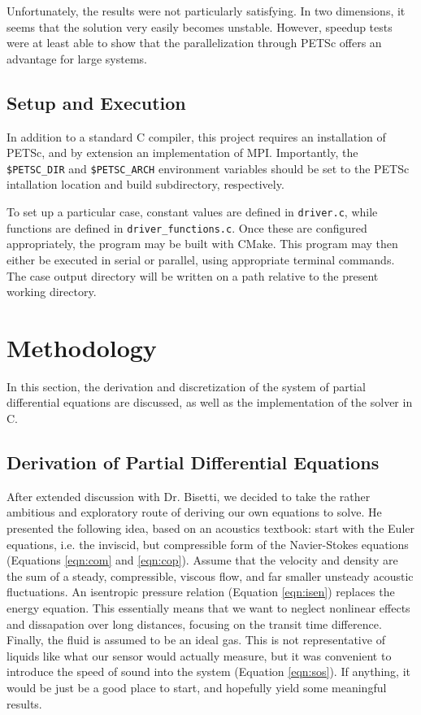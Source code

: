 \documentclass{article}
\begin{document}
Unfortunately, the results were not particularly satisfying. In two dimensions, it seems that the solution very easily becomes unstable. However, speedup tests were at least able to show that the parallelization through PETSc offers an advantage for large systems.

\subsection{Setup and Execution}

In addition to a standard C compiler, this project requires an installation of PETSc, and by extension an implementation of MPI. Importantly, the \verb|$PETSC_DIR| and \verb|$PETSC_ARCH| environment variables should be set to the PETSc intallation location and build subdirectory, respectively.

To set up a particular case, constant values are defined in \verb|driver.c|, while functions are defined in \verb|driver_functions.c|. Once these are configured appropriately, the program may be built with CMake. This program may then either be executed in serial or parallel, using appropriate terminal commands. The case output directory will be written on a path relative to the present working directory.

\section{Methodology}

In this section, the derivation and discretization of the system of partial differential equations are discussed, as well as the implementation of the solver in C.

\subsection{Derivation of Partial Differential Equations}

After extended discussion with Dr. Bisetti, we decided to take the rather ambitious and exploratory route of deriving our own equations to solve. He presented the following idea, based on an acoustics textbook: start with the Euler equations, i.e. the inviscid, but compressible form of the Navier-Stokes equations (Equations \ref{eqn:com} and \ref{eqn:cop}). Assume that the velocity and density are the sum of a steady, compressible, viscous flow, and far smaller unsteady acoustic fluctuations. An isentropic pressure relation (Equation \ref{eqn:isen}) replaces the energy equation. This essentially means that we want to neglect nonlinear effects and dissapation over long distances, focusing on the transit time difference. Finally, the fluid is assumed to be an ideal gas. This is not representative of liquids like what our sensor would actually measure, but it was convenient to introduce the speed of sound into the system (Equation \ref{eqn:sos}). If anything, it would be just be a good place to start, and hopefully yield some meaningful results.
\end{document}
